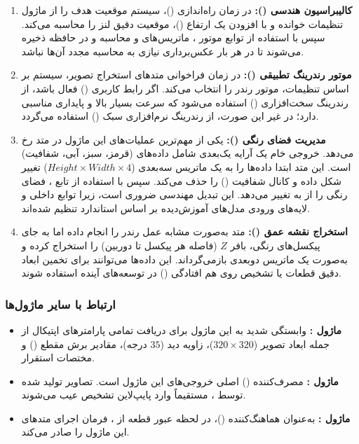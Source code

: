 \documentclass{article}
\begin{document}
\begin{enumerate}
	\item \textbf{کالیبراسیون هندسی ():} در زمان راه‌اندازی ()، سیستم موقعیت هدف را از ماژول تنظیمات خوانده و با افزودن یک ارتفاع ()، موقعیت دقیق لنز را محاسبه می‌کند. سپس با استفاده از توابع موتور ، ماتریس‌های  و  محاسبه و در حافظه ذخیره می‌شوند تا در هر بار عکس‌برداری نیازی به محاسبه مجدد آن‌ها نباشد.
	
	\item \textbf{موتور رندرینگ تطبیقی ():} در زمان فراخوانی متدهای استخراج تصویر، سیستم بر اساس تنظیمات، موتور رندر را انتخاب می‌کند. اگر رابط کاربری () فعال باشد، از رندرینگ سخت‌افزاری  () استفاده می‌شود که سرعت بسیار بالا و پایداری مناسبی دارد؛ در غیر این صورت، از رندرینگ نرم‌افزاری سبک () استفاده می‌گردد.
	
	\item \textbf{مدیریت فضای رنگی ():} یکی از مهم‌ترین عملیات‌های این ماژول در متد  رخ می‌دهد. خروجی خام  یک آرایه یک‌بعدی شامل داده‌های  (قرمز، سبز، آبی، شفافیت) است. این متد ابتدا داده‌ها را به یک ماتریس سه‌بعدی ($Height \times Width \times 4$) تغییر شکل داده و کانال شفافیت () را حذف می‌کند. سپس با استفاده از تابع ، فضای رنگی را از  به  تغییر می‌دهد. این تبدیل مهندسی ضروری است، زیرا توابع داخلی  و لایه‌های ورودی مدل‌های آموزش‌دیده  بر اساس استاندارد  تنظیم شده‌اند.
	
	\item \textbf{استخراج نقشه عمق ():} متد  به‌صورت مشابه عمل رندر را انجام داده اما به جای پیکسل‌های رنگی، بافر $Z$ (فاصله هر پیکسل تا دوربین) را استخراج کرده و به‌صورت یک ماتریس دوبعدی بازمی‌گرداند. این داده‌ها می‌توانند برای تخمین ابعاد دقیق قطعات یا تشخیص روی هم افتادگی () در توسعه‌های آینده استفاده شوند.
\end{enumerate}

\subsubsection{ارتباط با سایر ماژول‌ها}
\begin{itemize}
	\item \textbf{ماژول :} وابستگی شدید به این ماژول برای دریافت تمامی پارامترهای اپتیکال از جمله ابعاد تصویر ($320 \times 320$)، زاویه دید ($35$ درجه)، مقادیر برش مقطع () و مختصات استقرار.
	\item \textbf{ماژول :} مصرف‌کننده () اصلی خروجی‌های این ماژول است. تصاویر  تولید شده توسط ، مستقیماً وارد پایپ‌لاین تشخیص عیب می‌شوند.
	\item \textbf{ماژول :} به‌عنوان هماهنگ‌کننده ()، در لحظه عبور قطعه از ، فرمان اجرای متدهای این ماژول را صادر می‌کند.
\end{itemize}
\end{document}
